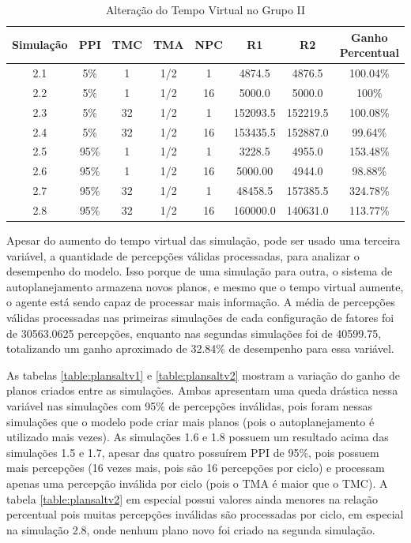 \begin{table}
    \begin{center}
        \caption{ Alteração do Tempo Virtual no Grupo II }
        \label{table:vtaltv2}
        \begin{tabular}{ |c|c|c|c|c|c|c|c| }
            \hline
            \textbf{Simulação} & \textbf{PPI} & \textbf{TMC} & \textbf{TMA} & \textbf{NPC} & \textbf{R1} & \textbf{R2} & \textbf{Ganho Percentual}\\
            \hline
            2.1 & 5\% & 1 & 1/2 & 1 & 4874.5 & 4876.5 & 100.04\%\\
            \hline
            2.2 & 5\% & 1 & 1/2 & 16 & 5000.0 & 5000.0 & 100\%\\
            \hline
            2.3 & 5\% & 32 & 1/2 & 1 & 152093.5 & 152219.5 & 100.08\%\\
            \hline
            2.4 & 5\% & 32 & 1/2 & 16 & 153435.5 & 152887.0 & 99.64\%\\
            \hline
            2.5 & 95\% & 1 & 1/2 & 1 & 3228.5 & 4955.0 & 153.48\%\\
            \hline
            2.6 & 95\% & 1 & 1/2 & 16 & 5000.00 & 4944.0 & 98.88\%\\
            \hline
            2.7 & 95\% & 32 & 1/2 & 1 & 48458.5 & 157385.5 & 324.78\%\\
            \hline
            2.8 & 95\% & 32 & 1/2 & 16 & 160000.0 & 140631.0 & 113.77\%\\
            \hline
            
        \end{tabular}{}
    \end{center}{}
\end{table}

Apesar do aumento do tempo virtual das simulação, pode ser usado uma terceira variável, a quantidade de percepções válidas processadas, para analizar o desempenho do modelo. Isso porque de uma simulação para outra, o sistema de autoplanejamento armazena novos planos, e mesmo que o tempo virtual aumente, o agente está sendo capaz de processar mais informação. A média de percepções válidas processadas nas primeiras simulações de cada configuração de fatores foi de 30563.0625 percepções, enquanto nas segundas simulações foi de 40599.75, totalizando um ganho aproximado de 32.84\% de desempenho para essa variável.

As tabelas \ref{table:plansaltv1} e \ref{table:plansaltv2} mostram a variação do ganho de planos criados entre as simulações. Ambas apresentam uma queda drástica nessa variável nas simulações com 95\% de percepções inválidas, pois foram nessas simulações que o modelo pode criar mais planos (pois o autoplanejamento é utilizado mais vezes). As simulações 1.6 e 1.8 possuem um resultado acima das
simulações 1.5 e 1.7, apesar das quatro possuírem PPI de 95\%, pois possuem mais percepções (16 vezes mais, pois são 16 percepções por ciclo) e processam apenas uma percepção inválida por ciclo (pois o TMA é maior que o TMC).
A tabela \ref{table:plansaltv2} em especial possui valores ainda menores na relação percentual pois muitas percepções inválidas são processadas por ciclo, em especial na simulação 2.8, onde nenhum plano novo foi criado na segunda simulação.


